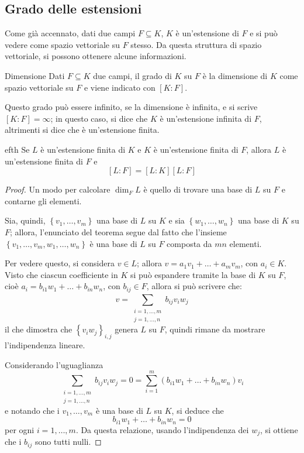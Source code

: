 \documentclass[11pt, a4paper]{scrartcl}
\theoremstyle{definition}
\numberwithin{esempio}{section}
\theoremstyle{definition}
\numberwithin{obs}{section}
\numberwithin{nota}{section}
\numberwithin{equation}{subsection}
\begin{document}
\subsection{Grado delle estensioni}
Come gi\`a accennato, dati due campi $F \subseteq K$, $K$ \`e un'estensione di $F$ e si pu\`o vedere come spazio vettoriale su $F$ stesso.
Da questa struttura di spazio vettoriale, si possono ottenere alcune informazioni.
\begin{definizione}
	{Dimensione}{}
	Dati $F \subseteq K$ due campi, il grado di $K$ su $F$ \`e la dimensione di $K$ come spazio vettoriale su $F$ e viene indicato con $[K:F]$.

	Questo grado pu\`o essere infinito, se la dimensione \`e infinita, e si scrive $[K:F] = \infty$; in questo caso, si dice che $K$ \`e un'estensione infinita di $F$, altrimenti si dice che \`e un'estensione finita.
\end{definizione}
\begin{teorema}
	{}{efth}
	Se $L$ \`e un'estensione finita di $K$ e $K$ \`e un'estensione finita di $F$, allora $L$ \`e un'estensione finita di $F$ e 
	\[
		[L:F] = [L:K][L:F]
	\] 
	\begin{proof}
	Un modo per calcolare $\dim _F L$ \`e quello di trovare una base di $L$ su $F$ e contarne gli elementi.

	Sia, quindi, $\left\{ v_1,\ldots,v_m \right\} $ una base di $L$ su $K$ e sia $\left\{ w_1,\ldots,w_n \right\} $ una base di $K$ su $F$; allora, l'enunciato del teorema segue dal fatto che l'insieme $\left\{ v_1,\ldots,v_m ,w_1 ,\ldots,w_n \right\} $ \`e una base di $L$ su $F$ composta da $mn$ elementi.

	Per vedere questo, si considera $v \in L$; allora $v=a_1v_1+ \ldots + a_m v_m$, con $a_i \in K$.
	Visto che ciascun coefficiente in $K$ si pu\`o espandere tramite la base di $K$ su $F$, cio\`e $a_i = b_{i1}w_1 + \ldots + b_{in} w_n $, con $b_{ij}  \in F$, allora si pu\`o scrivere che:
	\[
		v = \sum_{\substack{i=1,\ldots,m\\ j=1,\ldots,n}}^{} b_{ij} v_i w_j
	\] 
	il che dimostra che $\left\{ v_iw_j \right\}_{i,j}  $ genera $L$ su $F$, quindi rimane da mostrare l'indipendenza lineare.

	Considerando l'uguaglianza
	\[
		\sum_{\substack{i=1,\ldots,m \\ j =1,\ldots,n}}^{} b_{ij} v_i w_j = 0 = \sum_{i=1}^{m} \left(b_{i 1} w_1 + \ldots + b_{in} w_n\right) v_i
	\] 
	e notando che i $v_1, \ldots, v_m$ \`e una base di $L$ su $K$, si deduce che 
	\[
	b_{i 1} w_1 + \ldots+b_{in} w_n = 0
	\] 
	per ogni $i =1 ,\ldots, m$.
Da questa relazione, usando l'indipendenza dei $w_j$, si ottiene che i $b_{ij} $ sono tutti nulli.
	\end{proof}
\end{teorema}
\end{document}
